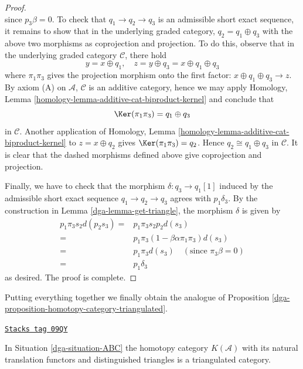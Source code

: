 \begin{proof}
$$$$
since $p_3\beta = 0$. To check that $q_1\to q_2\to q_3$
is an admissible short exact sequence, it remains to show
that in the underlying graded category, $q_2 = q_1\oplus q_3$
with the above two morphisms as coprojection and projection.
To do this, observe that in the underlying graded category
$\mathcal{C}$, there hold
$$
y = x\oplus q_1,\quad
z = y\oplus q_3 = x\oplus q_1\oplus q_3
$$
where $\pi_1\pi_3$ gives the projection morphism onto the first
factor: $x\oplus q_1\oplus q_3\to z$. By axiom (A) on
$\mathcal{A}$, $\mathcal{C}$ is an additive category, hence
we may apply
Homology, Lemma \ref{homology-lemma-additive-cat-biproduct-kernel}
and conclude that
$$
\Ker(\pi_1\pi_3) = q_1\oplus q_3
$$
in $\mathcal{C}$. Another application of
Homology, Lemma \ref{homology-lemma-additive-cat-biproduct-kernel}
to $z = x\oplus q_2$ gives $\Ker(\pi_1\pi_3) = q_2$.
Hence $q_2\cong q_1\oplus q_3$ in $\mathcal{C}$.
It is clear that the dashed morphisms defined above give
coprojection and projection.

\medskip\noindent
Finally, we have to check that the morphism
$\delta : q_3 \to q_1[1]$ induced by the admissible
short exact sequence $q_1\to q_2\to q_3$ agrees with
$p_1\delta_3$. By the construction in
Lemma \ref{dga-lemma-get-triangle}, the morphism $\delta$ is given by
\begin{align*}
p_1\pi_3s_2d(p_2s_3)
= &
p_1\pi_3s_2p_2d(s_3) \\
= &
p_1\pi_3(1-\beta\alpha\pi_1\pi_3)d(s_3) \\
= &
p_1\pi_3d(s_3)\quad (\text{since }\pi_3\beta = 0) \\
= &
p_1\delta_3
\end{align*}
as desired. The proof is complete.
\end{proof}

Putting everything together we finally obtain the analogue
of Proposition \ref{dga-proposition-homotopy-category-triangulated}.

\begin{proposition}
\label{dga-proposition-ABC-homotopy-category-triangulated}
\href{https://stacks.math.columbia.edu/tag/09QY}{\texttt{Stacks tag 09QY}}

In Situation \ref{dga-situation-ABC} the homotopy category $K(\mathcal{A})$
with its natural translation functors and distinguished triangles is a
triangulated category.
\end{proposition}

